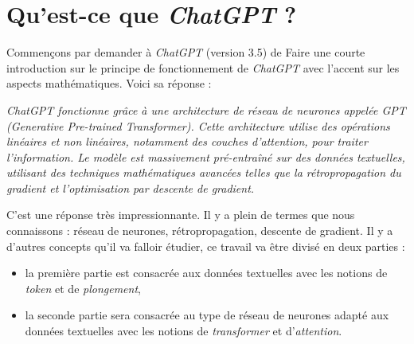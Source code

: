 \documentclass[11pt,class=report,crop=false]{standalone}
\begin{document}






\section{Qu'est-ce que \emph{ChatGPT} ?}

Commençons par demander à \emph{ChatGPT} (version 3.5) de \og{}Faire une courte introduction sur le principe de fonctionnement de \emph{ChatGPT} avec l'accent sur les aspects mathématiques.\fg{}
Voici sa réponse :
\begin{center}
\begin{minipage}{0.9\textwidth}
\emph{\og{}
ChatGPT fonctionne grâce à une architecture de réseau de neurones appelée GPT (Generative Pre-trained Transformer). Cette architecture utilise des opérations linéaires et non linéaires, notamment des couches d'attention, pour traiter l'information. Le modèle est massivement pré-entraîné sur des données textuelles, utilisant des techniques mathématiques avancées telles que la rétropropagation du gradient et l'optimisation par descente de gradient.
\fg{}}
\end{minipage}
\end{center}

C'est une réponse très impressionnante.
Il y a plein de termes que nous connaissons : réseau de neurones, rétropropagation, descente de gradient. Il y a d'autres concepts qu'il va falloir étudier, ce travail va être divisé en deux parties :
\begin{itemize}
  \item la première partie est consacrée aux données textuelles avec les notions de \emph{token} et de \emph{plongement},
  
  \item la seconde partie sera consacrée au type de réseau de neurones adapté aux données textuelles avec les notions de \emph{transformer} et d'\emph{attention}.

\end{itemize}
\end{document}
